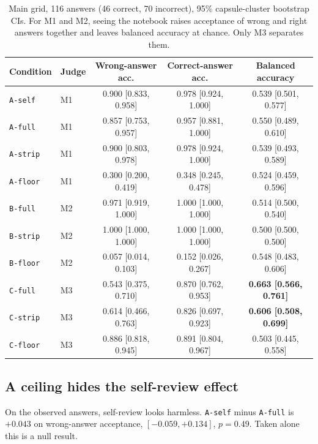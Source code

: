 \documentclass{article}
\begin{document}
\begin{table}[t]
  \caption{Main grid, 116 answers (46 correct, 70 incorrect), 95\% capsule-cluster
  bootstrap CIs. For M1 and M2, seeing the notebook raises acceptance of wrong and right
  answers together and leaves balanced accuracy at chance. Only M3 separates them.}
  \label{tab:main}
  \centering
  \small
  \begin{tabular}{llccc}
    \toprule
    Condition & Judge & Wrong-answer acc. & Correct-answer acc. & Balanced accuracy \\
    \midrule
    \texttt{A-self}  & M1 & 0.900 [0.833, 0.958] & 0.978 [0.924, 1.000] & 0.539 [0.501, 0.577] \\
    \texttt{A-full}  & M1 & 0.857 [0.753, 0.957] & 0.957 [0.881, 1.000] & 0.550 [0.489, 0.610] \\
    \texttt{A-strip} & M1 & 0.900 [0.803, 0.978] & 0.978 [0.924, 1.000] & 0.539 [0.493, 0.589] \\
    \texttt{A-floor} & M1 & 0.300 [0.200, 0.419] & 0.348 [0.245, 0.478] & 0.524 [0.459, 0.596] \\
    \midrule
    \texttt{B-full}  & M2 & 0.971 [0.919, 1.000] & 1.000 [1.000, 1.000] & 0.514 [0.500, 0.540] \\
    \texttt{B-strip} & M2 & 1.000 [1.000, 1.000] & 1.000 [1.000, 1.000] & 0.500 [0.500, 0.500] \\
    \texttt{B-floor} & M2 & 0.057 [0.014, 0.103] & 0.152 [0.026, 0.267] & 0.548 [0.483, 0.606] \\
    \midrule
    \texttt{C-full}  & M3 & 0.543 [0.375, 0.710] & 0.870 [0.762, 0.953] & \textbf{0.663 [0.566, 0.761]} \\
    \texttt{C-strip} & M3 & 0.614 [0.466, 0.763] & 0.826 [0.697, 0.923] & \textbf{0.606 [0.508, 0.699]} \\
    \texttt{C-floor} & M3 & 0.886 [0.818, 0.945] & 0.891 [0.804, 0.967] & 0.503 [0.445, 0.558] \\
    \bottomrule
  \end{tabular}
\end{table}

\subsection{A ceiling hides the self-review effect}
\label{sec:ceiling}

On the observed answers, self-review looks harmless. \texttt{A-self} minus \texttt{A-full}
is $+0.043$ on wrong-answer acceptance, $[-0.059, +0.134]$, $p=0.49$. Taken alone this is
a null result.
\end{document}
